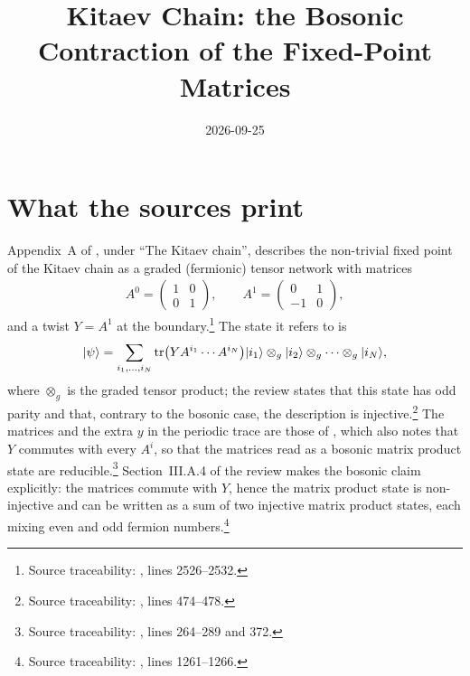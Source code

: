 \documentclass{article}
\title{Kitaev Chain: the Bosonic Contraction of the Fixed-Point Matrices}
\author{}
\date{2026-09-25}
\begin{document}
\maketitle
{}

\section{What the sources print}
Appendix~A of \cite{Cirac2021Matrix}, under ``The Kitaev chain'', describes the
non-trivial fixed point of the Kitaev chain \cite{Kitaev2001Majorana} as a
graded (fermionic) tensor network with matrices
\begin{align}
    A^0=\begin{pmatrix}1&0\\0&1\end{pmatrix},\qquad
    A^1=\begin{pmatrix}0&1\\-1&0\end{pmatrix},
    \label{eq:kitaev_tensor}
\end{align}
and a twist $Y=A^1$ at the boundary.\footnote{Source traceability:
    , lines 2526--2532.}
The state it refers to is
\begin{align}
    |\psi\rangle=\sum_{i_1,\ldots,i_N}\operatorname{tr}\bigl(YA^{i_1}\cdots A^{i_N}\bigr)
    |i_1\rangle\otimes_g|i_2\rangle\otimes_g\cdots\otimes_g|i_N\rangle,
    \label{eq:kitaev_state}
\end{align}
where $\otimes_g$ is the graded tensor product; the review states that this
state has odd parity and that, contrary to the bosonic case, the description is
injective.\footnote{Source traceability:
    , lines 474--478.}
The matrices and the extra $y$ in the periodic trace are those of
\cite{Bultinck2017FermionicMPS}, which also notes that $Y$ commutes with every
$A^i$, so that the matrices read as a bosonic matrix product state are
reducible.\footnote{Source traceability:
    , lines 264--289 and 372.}
Section~III.A.4 of the review makes the bosonic claim explicitly: the
matrices commute with $Y$, hence the matrix product state is non-injective
and can be written as a sum of two injective matrix product states, each
mixing even and odd fermion numbers.\footnote{Source traceability:
    , lines 1261--1266.}
\end{document}
